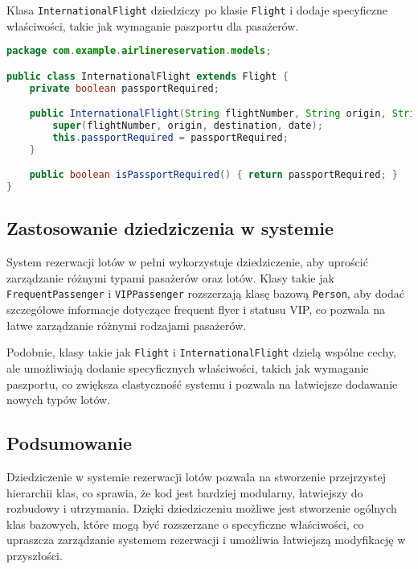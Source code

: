 Klasa \texttt{InternationalFlight} dziedziczy po klasie \texttt{Flight} i dodaje specyficzne właściwości, takie jak wymaganie paszportu dla pasażerów.

\begin{lstlisting}[language=Java, caption=Klasa InternationalFlight]
package com.example.airlinereservation.models;

public class InternationalFlight extends Flight {
    private boolean passportRequired;

    public InternationalFlight(String flightNumber, String origin, String destination, LocalDate date, boolean passportRequired) {
        super(flightNumber, origin, destination, date);
        this.passportRequired = passportRequired;
    }

    public boolean isPassportRequired() { return passportRequired; }
}
\end{lstlisting}

\subsection{Zastosowanie dziedziczenia w systemie}

System rezerwacji lotów w pełni wykorzystuje dziedziczenie, aby uprościć zarządzanie różnymi typami pasażerów oraz lotów. Klasy takie jak \texttt{FrequentPassenger} i \texttt{VIPPassenger} rozszerzają klasę bazową \texttt{Person}, aby dodać szczegółowe informacje dotyczące frequent flyer i statusu VIP, co pozwala na łatwe zarządzanie różnymi rodzajami pasażerów.

Podobnie, klasy takie jak \texttt{Flight} i \texttt{InternationalFlight} dzielą wspólne cechy, ale umożliwiają dodanie specyficznych właściwości, takich jak wymaganie paszportu, co zwiększa elastyczność systemu i pozwala na łatwiejsze dodawanie nowych typów lotów.

\subsection{Podsumowanie}

Dziedziczenie w systemie rezerwacji lotów pozwala na stworzenie przejrzystej hierarchii klas, co sprawia, że kod jest bardziej modularny, łatwiejszy do rozbudowy i utrzymania. Dzięki dziedziczeniu możliwe jest stworzenie ogólnych klas bazowych, które mogą być rozszerzane o specyficzne właściwości, co upraszcza zarządzanie systemem rezerwacji i umożliwia łatwiejszą modyfikację w przyszłości.
